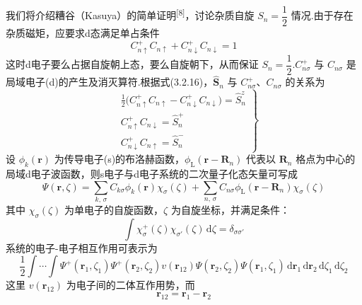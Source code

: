 我们将介绍糟谷（Kasuya）的简单证明\textsuperscript{[8]}，讨论杂质自旋 $S_{n}=\dfrac{1}{2}$ 情况.由于存在杂质磁矩，应要求d态满足单占条件
\begin{equation}
  C^{+}_{n\uparrow}C_{n\uparrow}+C^{+}_{n\downarrow}C_{n\downarrow}=1
\end{equation}
这时d电子要么占据自旋朝上态，要么自旋朝下，从而保证 $S_{n}=\dfrac{1}{2}$.$C^{+}_{n\sigma}$ 与 $C_{n\sigma}$ 是局域电子(d)的产生及消灭算符.根据式(3.2.16)，$\hat{\boldsymbol{S}}_{n}$ 与 $C^{+}_{n\sigma}$、$C_{n\sigma}$ 的关系为
\begin{equation}
\left.
\begin{aligned}
  &\frac{1}{2}\bigl(C^{+}_{n\uparrow}C_{n\uparrow}
  -C^{+}_{n\downarrow}C_{n\downarrow}\bigr)=\hat{S}^{z}_{n}\\
  &C^{+}_{n\uparrow}C_{n\downarrow}=\hat{S}^{+}_{n}\\
  &C^{+}_{n\downarrow}C_{n\uparrow}=\hat{S}^{-}_{n}
\end{aligned}\right\}
\end{equation}
设 $\phi_{k}(\boldsymbol{r})$ 为传导电子(s)的布洛赫函数，$\phi_{\mathrm{L}}(\boldsymbol{r}-\boldsymbol{R}_{n})$ 代表以 $\boldsymbol{R}_{n}$ 格点为中心的局域d电子波函数，则s电子与d电子系统的二次量子化态矢量可写成
\begin{equation}
  \varPsi(\boldsymbol{r},\zeta)
  =\sum_{k,\,\sigma}C_{k\sigma}\phi_{k}(\boldsymbol{r})\chi_{\sigma}(\zeta)
  +\sum_{n,\,\sigma}C_{n\sigma}
  \phi_{\mathrm{L}}(\boldsymbol{r}-\boldsymbol{R}_{n})\chi_{\sigma}(\zeta)
\end{equation}
其中 $\chi_{\sigma}(\zeta)$ 为单电子的自旋函数，$\zeta$ 为自旋坐标，并满足条件：
\begin{equation}
  \int\chi^{+}_{\sigma}(\zeta)\chi_{\sigma'}(\zeta)\,\mathrm{d}\zeta
  =\delta_{\sigma\sigma'}
\end{equation}
系统的电子-电子相互作用可表示为
\begin{equation}
  \frac{1}{2}\int\cdots\int
  \varPsi^{+}(\boldsymbol{r}_{1},\zeta_{1})
  \varPsi^{+}(\boldsymbol{r}_{2},\zeta_{2})
  v(\boldsymbol{r}_{12})
  \varPsi(\boldsymbol{r}_{2},\zeta_{2})
  \varPsi(\boldsymbol{r}_{1},\zeta_{1})
  \,\mathrm{d}\boldsymbol{r}_{1}\,\mathrm{d}\boldsymbol{r}_{2}
  \,\mathrm{d}\zeta_{1}\,\mathrm{d}\zeta_{2}
\end{equation}
这里 $v(\boldsymbol{r}_{12})$ 为电子间的二体互作用势，而
\begin{equation}
  \boldsymbol{r}_{12}=\boldsymbol{r}_{1}-\boldsymbol{r}_{2}
\end{equation}
